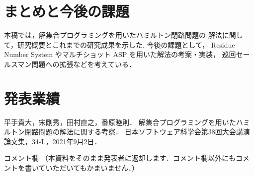 \documentclass[a4j,10pt]{jarticle}
\begin{document}
\begin{multicols}{1}
\section{まとめと今後の課題}
本稿では，解集合プログラミングを用いたハミルトン閉路問題の
解法に関して，研究概要とこれまでの研究成果を示した. 
今後の課題として，
Residue Number System やマルチショット ASP を用いた解法の考案・実装，
巡回セールスマン問題への拡張などを考えている．

\section{発表業績}
\noindent 平手貴大，宋剛秀，田村直之，番原睦則．
解集合プログラミングを用いたハミルトン閉路問題の解法に関する考察．
日本ソフトウェア科学会第38回大会講演論文集，34-L，2021年9月2日．



\end{multicols}
\vfill
\noindent
{\gt コメント欄}
{\footnotesize
（本資料をそのまま発表者に返却します．コメント欄以外にもコメントを書いていただいてもかまいません．）}
\\
\fbox{\begin{minipage}{\textwidth}\noindent\\\\\end{minipage}}	
\end{document}
